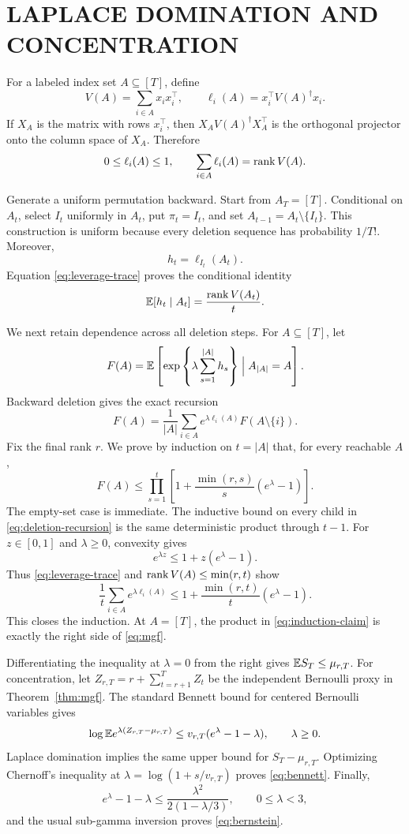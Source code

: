 \section{LAPLACE DOMINATION AND CONCENTRATION}
\label{app:mgf}

For a labeled index set $A\subseteq[T]$, define
\[
 V(A)=\sum_{i\in A}x_ix_i^\top,
 \qquad \ell_i(A)=x_i^\top V(A)^\dagger x_i.
\]
If $X_A$ is the matrix with rows $x_i^\top$, then
$X_AV(A)^\dagger X_A^\top$ is the orthogonal projector onto the column space of $X_A$. Therefore
\begin{equation}
 0\le\ell_i(A)\le1,
 \qquad
 \sum_{i\in A}\ell_i(A)=\operatorname{rank} V(A).
 \label{eq:leverage-trace}
\end{equation}

Generate a uniform permutation backward. Start from $A_T=[T]$. Conditional on $A_t$, select $I_t$ uniformly in $A_t$, put $\pi_t=I_t$, and set $A_{t-1}=A_t\setminus\{I_t\}$. This construction is uniform because every deletion sequence has probability $1/T!$. Moreover,
\[
 h_t=\ell_{I_t}(A_t).
\]
Equation \eqref{eq:leverage-trace} proves the conditional identity
\[
 \mathbb E[h_t\mid A_t]=\frac{\operatorname{rank} V(A_t)}t.
\]

We next retain dependence across all deletion steps. For $A\subseteq[T]$, let
\[
 F(A)=\mathbb E\left[
 \exp\left\{\lambda\sum_{s=1}^{|A|}h_s\right\}
 \mathrel{\Big|} A_{|A|}=A\right].
\]
Backward deletion gives the exact recursion
\begin{equation}
 F(A)=\frac1{|A|}\sum_{i\in A}
 e^{\lambda\ell_i(A)}F(A\setminus\{i\}).
 \label{eq:deletion-recursion}
\end{equation}
Fix the final rank $r$. We prove by induction on $t=|A|$ that, for every reachable $A$,
\begin{equation}
 F(A)\le\prod_{s=1}^t
 \left[1+\frac{\min(r,s)}s(e^\lambda-1)\right].
 \label{eq:induction-claim}
\end{equation}
The empty-set case is immediate. The inductive bound on every child in \eqref{eq:deletion-recursion} is the same deterministic product through $t-1$. For $z\in[0,1]$ and $\lambda\ge0$, convexity gives
\[
 e^{\lambda z}\le1+z(e^\lambda-1).
\]
Thus \eqref{eq:leverage-trace} and $\operatorname{rank} V(A)\le\min(r,t)$ show
\[
 \frac1t\sum_{i\in A}e^{\lambda\ell_i(A)}
 \le1+\frac{\min(r,t)}t(e^\lambda-1).
\]
This closes the induction. At $A=[T]$, the product in \eqref{eq:induction-claim} is exactly the right side of \eqref{eq:mgf}.

Differentiating the inequality at $\lambda=0$ from the right gives
$\mathbb E S_T\le\mu_{r,T}$. For concentration, let
$Z_{r,T}=r+\sum_{t=r+1}^TZ_t$ be the independent Bernoulli proxy in Theorem~\ref{thm:mgf}. The standard Bennett bound for centered Bernoulli variables gives
\begin{equation}
 \log\mathbb E e^{\lambda(Z_{r,T}-\mu_{r,T})}
 \le v_{r,T}(e^\lambda-1-\lambda),
 \qquad \lambda\ge0.
 \label{eq:bernoulli-mgf}
\end{equation}
Laplace domination implies the same upper bound for $S_T-\mu_{r,T}$. Optimizing Chernoff's inequality at
$\lambda=\log(1+s/v_{r,T})$ proves \eqref{eq:bennett}. Finally,
\[
 e^\lambda-1-\lambda
 \le\frac{\lambda^2}{2(1-\lambda/3)},
 \qquad 0\le\lambda<3,
\]
and the usual sub-gamma inversion proves \eqref{eq:bernstein}.

